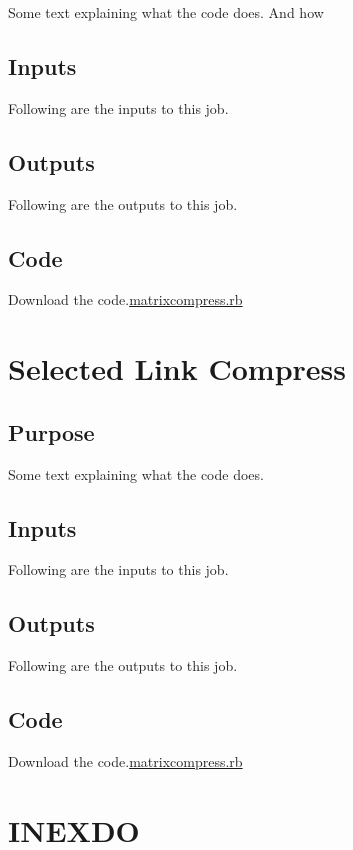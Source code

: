\documentclass[
  letterpaper,
  DIV=11,
  numbers=noendperiod]{scrreprt}
\begin{document}
Some text explaining what the code does. And how

\section{Inputs}

Following are the inputs to this job.

\section{Outputs}

Following are the outputs to this job.

\section{Code}

Download the code.\href{../first.rb}{matrixcompress.rb}

\chapter{Selected Link Compress}\label{selected-link-compress}

\section{Purpose}

Some text explaining what the code does.

\section{Inputs}

Following are the inputs to this job.

\section{Outputs}

Following are the outputs to this job.

\section{Code}

Download the code.\href{../first.rb}{matrixcompress.rb}

\chapter{INEXDO}\label{inexdo}
\end{document}
